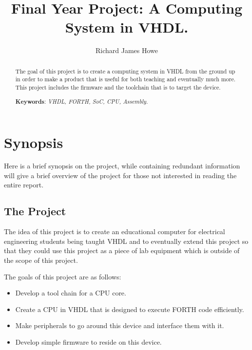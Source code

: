 \documentclass	[a4paper, 10pt]	{article}
\title		{Final Year Project: A Computing System in VHDL.}
\author		{Richard James Howe}
\begin{document}
	\maketitle
	\hrulefill

	\begin{abstract}
    The goal of this project is to create a computing system in VHDL from the
    ground up in order to make a product that is useful for both teaching and
    eventually much more. This project includes the firmware and the toolchain
    that is to target the device.

      \smallskip
      \begin{center}
      \noindent \textbf{Keywords}: \emph{VHDL, FORTH, SoC, CPU, Assembly.}
      \end{center}
	\end{abstract}

	\tableofcontents
  \listoffigures

  \section{Synopsis}

    Here is a brief synopsis on the project, while containing redundant information
    will give a brief overview of the project for those not interested in reading
    the entire report.

    \subsection{The Project}

    The idea of this project is to create an educational computer for electrical engineering
    students being taught VHDL and to eventually extend this project so that they could
    use this project as a piece of lab equipment which is outside of the scope of this project.

    The goals of this project are as follows:

    \begin{itemize}
      \item Develop a tool chain for a CPU core.
      \item Create a CPU in VHDL that is designed to execute FORTH code efficiently.
      \item Make peripherals to go around this device and interface them with it.
      \item Develop simple firmware to reside on this device.
    \end{itemize}
\end{document}
